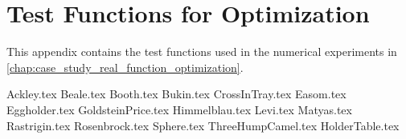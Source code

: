 \chapter{Test Functions for Optimization}
\label{app:test_functions}
  This appendix contains the test functions used in the numerical experiments in 
  \vref{chap:case_study_real_function_optimization}.

  {Ackley.tex}
  {Beale.tex}
  {Booth.tex}
  {Bukin.tex}
  {CrossInTray.tex}
  {Easom.tex}
  {Eggholder.tex}
  {GoldsteinPrice.tex}
  {Himmelblau.tex}
  {Levi.tex}
  {Matyas.tex}
  {Rastrigin.tex}
  {Rosenbrock.tex}
  {Sphere.tex}
  {ThreeHumpCamel.tex}
  {HolderTable.tex}